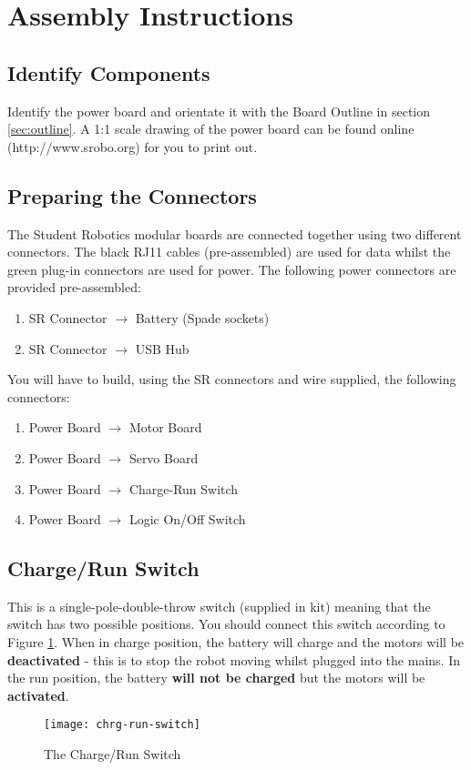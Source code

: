 
\section{Assembly Instructions}
\subsection{Identify Components}
Identify the power board and orientate it with the Board Outline in section \ref{sec:outline}. A 1:1 scale drawing of the power board can be found online (http://www.srobo.org) for you to print out.

\subsection{Preparing the Connectors}
The Student Robotics modular boards are connected together using two different connectors. The black RJ11 cables (pre-assembled) are used for data whilst the green plug-in connectors are used for power. The following power connectors are provided pre-assembled:
\begin{enumerate}
\item SR Connector \(\rightarrow\) Battery (Spade sockets)
\item SR Connector \(\rightarrow\) USB Hub
\end{enumerate}

You will have to build, using the SR connectors and wire supplied, the following connectors:

\begin{enumerate}
\item Power Board  \(\rightarrow\) Motor Board
\item Power Board  \(\rightarrow\) Servo Board
\item Power Board  \(\rightarrow\) Charge-Run Switch
\item Power Board  \(\rightarrow\) Logic On/Off Switch
\end{enumerate}

\subsection{Charge/Run Switch}
This is a single-pole-double-throw switch (supplied in kit) meaning that the switch has two possible positions. You should connect this switch according to Figure \ref{fig:chrgrun}. When in charge position, the battery will charge and the motors will be \textbf{deactivated} - this is to stop the robot moving whilst plugged into the mains. In the run position, the battery \textbf{will not be charged} but the motors will be \textbf{activated}.
\begin{figure}[h!]
\center
\texttt{[image: chrg-run-switch]}
\caption{The Charge/Run Switch}
\label{fig:chrgrun}
\end{figure}

